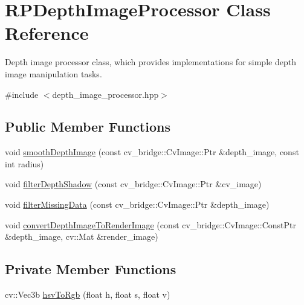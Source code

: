 \hypertarget{class_r_p_depth_image_processor}{\section{\-R\-P\-Depth\-Image\-Processor \-Class \-Reference}
\label{class_r_p_depth_image_processor}
}


\-Depth image processor class, which provides implementations for simple depth image manipulation tasks.  




{\ttfamily \#include $<$depth\-\_\-image\-\_\-processor.\-hpp$>$}

\subsection*{\-Public \-Member \-Functions}
\begin{DoxyCompactItemize}
\item 
void \hyperlink{class_r_p_depth_image_processor_aee8779744cbade3d2db9829be5af039a}{smooth\-Depth\-Image} (const cv\-\_\-bridge\-::\-Cv\-Image\-::\-Ptr \&depth\-\_\-image, const int radius)
\item 
void \hyperlink{class_r_p_depth_image_processor_ab6fe09741fe35ce8bab109eecb2bde0d}{filter\-Depth\-Shadow} (const cv\-\_\-bridge\-::\-Cv\-Image\-::\-Ptr \&cv\-\_\-image)
\item 
void \hyperlink{class_r_p_depth_image_processor_a562a743803a7ef4be02876091d0b2e51}{filter\-Missing\-Data} (const cv\-\_\-bridge\-::\-Cv\-Image\-::\-Ptr \&depth\-\_\-image)
\item 
void \hyperlink{class_r_p_depth_image_processor_aeb06512b13e61a0a1ea225eab32093f1}{convert\-Depth\-Image\-To\-Render\-Image} (const cv\-\_\-bridge\-::\-Cv\-Image\-::\-Const\-Ptr \&depth\-\_\-image, cv\-::\-Mat \&render\-\_\-image)
\end{DoxyCompactItemize}
\subsection*{\-Private \-Member \-Functions}
\begin{DoxyCompactItemize}
\item 
cv\-::\-Vec3b \hyperlink{class_r_p_depth_image_processor_a2d00a7d190f654ec83121e65f3d9ca05}{hsv\-To\-Rgb} (float h, float s, float v)
\end{DoxyCompactItemize}

